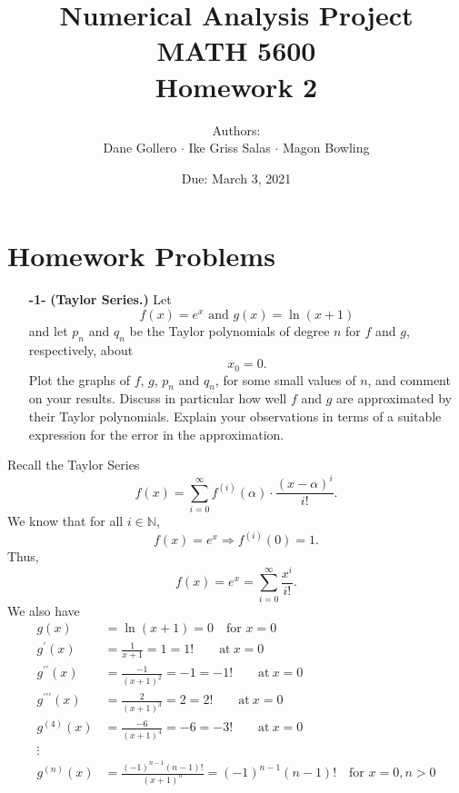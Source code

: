 \documentclass[11pt]{article}
\theoremstyle{definition}
\newcommand{\1}[1]{\mathbf{1} \left \{ #1 \right \}}
\begin{document}
\title{Numerical Analysis Project \\ MATH 5600 \\ Homework 2}
\date{Due: March 3, 2021}
\author{Authors: \\ Dane Gollero $\cdot$ Ike Griss Salas $\cdot$ Magon Bowling}

\maketitle

\tableofcontents

\section{Homework Problems}

\begin{itemize}
    \item[{\textbf{-1-}}] \textbf{(Taylor Series.)}  Let
    \begin{equation}
        f(x)=e^x \text{ and } g(x)=\ln(x+1)
    \end{equation}
    and let $p_n$ and $q_n$ be the Taylor polynomials of degree $n$ for $f$ and $g$, respectively, about
    \begin{equation}
        x_0 = 0.
    \end{equation}
    Plot the graphs of $f$, $g$, $p_n$ and $q_n$, for some small values of $n$, and comment on your results.  Discuss in particular how well $f$ and $g$ are approximated by their Taylor polynomials.  Explain your observations in terms of a suitable expression for the error in the approximation.
\end{itemize}
Recall the Taylor Series
\[f(x) = \sum_{i=0}^{\infty} f^{(i)} (\alpha) \cdot \frac{(x-\alpha)^i}{i!}.\]
We know that for all \(i \in \mathbb{N}\),
\[f(x) = e^x \Rightarrow f^{(i)}(0) = 1.\]
Thus,
\[f(x) = e^x = \sum_{i=0}^{\infty} \frac{x^i}{i!}.\]
We also have
\begin{equation*}
    \begin{split}
        g(x) &= \ln (x+1) = 0 \quad \text{for } x = 0 \\
        g^{\prime}(x) &= \frac{1}{x+1} = 1 = 1! \qquad \text{at} \ x = 0 \\
        g^{\prime\prime}(x) &= \frac{-1}{(x+1)^2} = -1 = -1! \qquad \text{at} \ x = 0 \\
        g^{\prime\prime\prime}(x) &= \frac{2}{(x+1)^3} = 2 = 2! \qquad \text{at} \ x = 0 \\
        g^{(4)}(x) &= \frac{-6}{(x+1)^4} = -6 = -3! \qquad \text{at} \ x = 0 \\
        \vdots \\
        g^{(n)} (x) &= \frac{(-1)^{n-1} (n-1)!}{(x+1)^n} = (-1)^{n-1} (n-1)! \quad \text{for } x=0, n>0
    \end{split}
\end{equation*}
\end{document}
